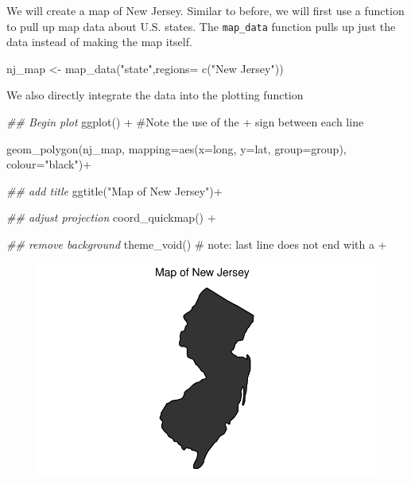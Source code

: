 \documentclass[
  letterpaper,
  DIV=11,
  numbers=noendperiod]{scrreprt}
\newenvironment{Shaded}{\begin{snugshade}}{\end{snugshade}}
\newcommand{\AttributeTok}[1]{\textcolor[rgb]{0.40,0.45,0.13}{#1}}
\newcommand{\CommentTok}[1]{\textcolor[rgb]{0.37,0.37,0.37}{#1}}
\newcommand{\DocumentationTok}[1]{\textcolor[rgb]{0.37,0.37,0.37}{\textit{#1}}}
\newcommand{\FunctionTok}[1]{\textcolor[rgb]{0.28,0.35,0.67}{#1}}
\newcommand{\NormalTok}[1]{\textcolor[rgb]{0.00,0.23,0.31}{#1}}
\newcommand{\OtherTok}[1]{\textcolor[rgb]{0.00,0.23,0.31}{#1}}
\newcommand{\SpecialCharTok}[1]{\textcolor[rgb]{0.37,0.37,0.37}{#1}}
\newcommand{\StringTok}[1]{\textcolor[rgb]{0.13,0.47,0.30}{#1}}
\begin{document}
We will create a map of New Jersey. Similar to before, we will first use
a function to pull up map data about U.S. states. The \texttt{map\_data}
function pulls up just the data instead of making the map itself.

\begin{Shaded}
\begin{Highlighting}[]
\NormalTok{nj\_map }\OtherTok{\textless{}{-}} \FunctionTok{map\_data}\NormalTok{(}\StringTok{"state"}\NormalTok{,}\AttributeTok{regions=} \FunctionTok{c}\NormalTok{(}\StringTok{"New Jersey"}\NormalTok{))}
\end{Highlighting}
\end{Shaded}

We also directly integrate the data into the plotting function

\begin{Shaded}
\begin{Highlighting}[]
\DocumentationTok{\#\# Begin plot}
\FunctionTok{ggplot}\NormalTok{() }\SpecialCharTok{+} \CommentTok{\#Note the use of the + sign between each line}

  \FunctionTok{geom\_polygon}\NormalTok{(nj\_map, }\AttributeTok{mapping=}\FunctionTok{aes}\NormalTok{(}\AttributeTok{x=}\NormalTok{long, }\AttributeTok{y=}\NormalTok{lat, }\AttributeTok{group=}\NormalTok{group), }
               \AttributeTok{colour=}\StringTok{"black"}\NormalTok{)}\SpecialCharTok{+}
  
  \DocumentationTok{\#\# add title}
  \FunctionTok{ggtitle}\NormalTok{(}\StringTok{"Map of New Jersey"}\NormalTok{)}\SpecialCharTok{+}
  
  \DocumentationTok{\#\# adjust projection}
  \FunctionTok{coord\_quickmap}\NormalTok{() }\SpecialCharTok{+}
  
  \DocumentationTok{\#\# remove background}
  \FunctionTok{theme\_void}\NormalTok{() }\CommentTok{\# note: last line does not end with a +}
\end{Highlighting}
\end{Shaded}

\begin{figure}[H]

{\centering \includegraphics{12-Maps_files/figure-pdf/unnamed-chunk-13-1.pdf}

}

\end{figure}
\end{document}
